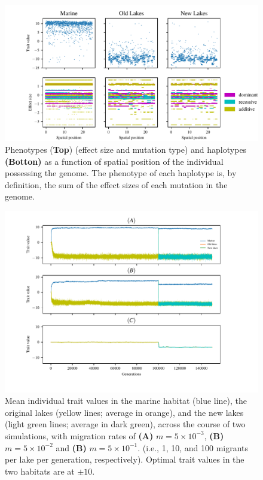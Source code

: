 \documentclass{article}
\begin{document}
\begin{figure}
	\begin{center}
  		\includegraphics[width=1.0\linewidth]{Final_Plots/Haplo_small.pdf}
  		\caption{
			Phenotypes (\textbf{Top}) (effect size and mutation type) and haplotypes \textbf{(Botton)} as a function of spatial position of the individual 
			possessing the genome. The phenotype of each haplotype is, by definition, the sum of the 
			effect sizes of each mutation in the genome. 
		}
  		\label{fig:Haplo_Pheno}
	\end{center}
\end{figure}


\begin{figure}
	\begin{center}
  		\includegraphics[width=1.0\linewidth]{Final_Plots/Pheno_Time_supp.pdf}
  		\caption{
		Mean individual trait values in the marine habitat (blue line),
        		the original lakes (yellow lines; average in orange),
        		and the new lakes (light green lines; average in dark green),
        		across the course of two simulations, with migration rates of
        		\textbf{(A)} $m=5 \times 10^{-3}$,
        		\textbf{(B)} $m=5 \times 10^{-2}$ and
		\textbf{(B)} $m=5 \times 10^{-1}$.
        		(i.e., 1, 10, and 100 migrants per lake per generation, respectively).
        		Optimal trait values in the two habitats are at $\pm 10$.
		}
  		\label{fig:phenotype_time_supp}
	\end{center}
\end{figure}
\end{document}
